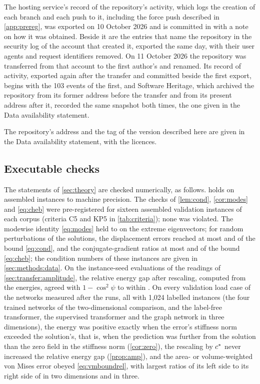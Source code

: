 The hosting service's record of the repository's activity, which logs the creation of each
branch and each push to it, including the force push described in \ref{app:prereg}, was
exported on 10 October 2026 and is committed in  with a note on
how it was obtained. Beside it are the entries that name the repository in the security
log of the account that created it, exported the same day, with their user agents and
request identifiers removed. On 11 October 2026 the repository was transferred from that
account to the first author's and renamed. Its record of activity, exported again after the
transfer and committed beside the first export, begins with the 103 events of the first,
and Software Heritage, which archived the repository from its former address before the
transfer and from its present address after it, recorded the same snapshot both times, the
one given in the Data availability statement.

The repository's address and the tag of the version described here are given in the Data
availability statement, with the licences.

\subsection{Executable checks}\label{app:repro:checks}

The statements of \cref{sec:theory} are checked numerically, as follows. 
holds on assembled instances to machine precision. The checks of \cref{lem:cond},
\cref{cor:modes} and \eqref{eq:cheb} were pre-registered for sixteen assembled validation
instances of each corpus (criteria C5 and KP5 in \cref{tab:criteria}); none was violated.
The modewise identity \eqref{eq:modes} held to \numModesPhrase{} on the extreme
eigenvectors; for random perturbations of the solutions, the displacement errors reached at
most \numCondTwo{} and \numCondThree{} of the bound \eqref{eq:cond}, and the
conjugate-gradient ratios at most \numChebTwo{} and \numChebThree{} of the bound
\eqref{eq:cheb}; the condition numbers of these instances are given in
\cref{sec:methods:data}. On the \numAmpRows{} instance-seed evaluations of the readings of
\cref{sec:transfer:amplitude}, the relative energy gap after rescaling, computed from the
energies, agreed with $1-\cos^2\psi$ to within \numAmpIdentity{}. On every validation load
case of the networks measured after the runs, all with 1,024 labelled instances (the four
trained networks of the two-dimensional comparison, and the label-free transformer, the
supervised transformer and the graph network in three dimensions), the energy was positive
exactly when the error's stiffness norm exceeded the solution's, that is, when the
prediction was further from the solution than the zero field in the stiffness norm
(\cref{cor:zero}), the rescaling by $c^{\ast}$ never increased the relative energy gap
(\cref{prop:amp}), and the area- or volume-weighted von Mises error obeyed
\eqref{eq:vmboundrel}, with largest ratios of its left side to its right side of
\numSpecBoundMax{} in two dimensions and \numFieldBoundMax{} in three.

